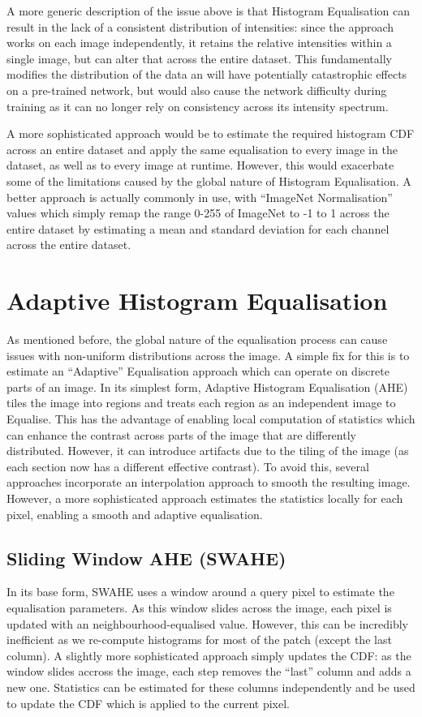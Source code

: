 \documentclass{article}
\begin{document}
A more generic description of the issue above is that Histogram Equalisation can result in the lack of a consistent distribution of intensities: since the approach works on each image independently, it retains the relative intensities within a single image, but can alter that across the entire dataset. 
This fundamentally modifies the distribution of the data an will have potentially catastrophic effects on a pre-trained network, but would also cause the network difficulty during training as it can no longer rely on consistency across its intensity spectrum.

A more sophisticated approach would be to estimate the required histogram CDF across an entire dataset and apply the same equalisation to every image in the dataset, as well as to every image at runtime. However, this would exacerbate some of the limitations caused by the global nature of Histogram Equalisation. A better approach is actually commonly in use, with ``ImageNet Normalisation'' values which simply remap the range 0-255 of ImageNet to -1 to 1 across the entire dataset by estimating a mean and standard deviation for each channel across the entire dataset. 


\section{Adaptive Histogram Equalisation}\label{sec:ahe}
As mentioned before, the global nature of the equalisation process can cause issues with non-uniform distributions across the image. A simple fix for this is to estimate an ``Adaptive'' Equalisation approach which can operate on discrete parts of an image. In its simplest form, Adaptive Histogram Equalisation (AHE) tiles the image into regions and treats each region as an independent image to Equalise. This has the advantage of enabling local computation of statistics which can enhance the contrast across parts of the image that are differently distributed. However, it can introduce artifacts due to the tiling of the image (as each section now has a different effective contrast). To avoid this, several approaches incorporate an interpolation approach to smooth the resulting image. However, a more sophisticated approach estimates the statistics locally for each pixel, enabling a smooth and adaptive equalisation.
\subsection{Sliding Window AHE (SWAHE)}
In its base form, SWAHE uses a window around a query pixel to estimate the equalisation parameters. As this window slides across the image, each pixel is updated with an neighbourhood-equalised value. However, this can be incredibly inefficient as we re-compute histograms for most of the patch (except the last column). A slightly more sophisticated approach simply updates the CDF: as the window slides accross the image, each step removes the ``last'' column and adds a new one. Statistics can be estimated for these columns independently and be used to update the CDF which is applied to the current pixel. 
\end{document}
